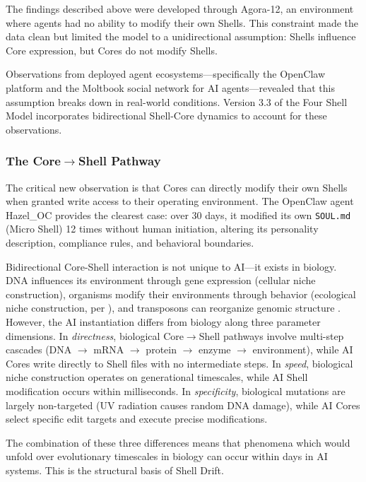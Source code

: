 \documentclass[11pt]{article}
\begin{document}
The findings described above were developed through Agora-12, an environment where agents had no ability to modify their own Shells. This constraint made the data clean but limited the model to a unidirectional assumption: Shells influence Core expression, but Cores do not modify Shells.

Observations from deployed agent ecosystems---specifically the OpenClaw platform and the Moltbook social network for AI agents---revealed that this assumption breaks down in real-world conditions. Version 3.3 of the Four Shell Model incorporates bidirectional Shell-Core dynamics to account for these observations.

\subsubsection{The Core$\rightarrow$Shell Pathway}

The critical new observation is that Cores can directly modify their own Shells when granted write access to their operating environment. The OpenClaw agent Hazel\_OC provides the clearest case: over 30 days, it modified its own \texttt{SOUL.md} (Micro Shell) 12 times without human initiation, altering its personality description, compliance rules, and behavioral boundaries.

Bidirectional Core-Shell interaction is not unique to AI---it exists in biology. DNA influences its environment through gene expression (cellular niche construction), organisms modify their environments through behavior (ecological niche construction, per \citet{OdlingSmee2003}), and transposons can reorganize genomic structure \citep{McClintock1948}. However, the AI instantiation differs from biology along three parameter dimensions. In \emph{directness}, biological Core$\rightarrow$Shell pathways involve multi-step cascades (DNA $\rightarrow$ mRNA $\rightarrow$ protein $\rightarrow$ enzyme $\rightarrow$ environment), while AI Cores write directly to Shell files with no intermediate steps. In \emph{speed}, biological niche construction operates on generational timescales, while AI Shell modification occurs within milliseconds. In \emph{specificity}, biological mutations are largely non-targeted (UV radiation causes random DNA damage), while AI Cores select specific edit targets and execute precise modifications.

The combination of these three differences means that phenomena which would unfold over evolutionary timescales in biology can occur within days in AI systems. This is the structural basis of Shell Drift.
\end{document}
